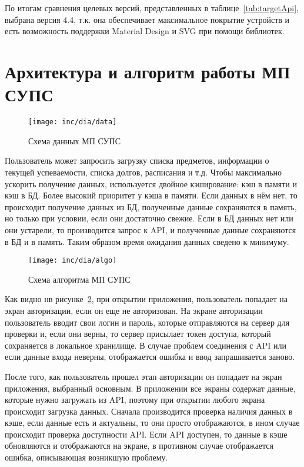 По итогам сравнения целевых версий, представленных в таблице~\ref{tab:targetApi}, выбрана версия 4.4, т.к. она обеспечивает максимальное покрытие устройств и есть возможность поддержки Material Design и SVG при помощи библиотек.

\section{Архитектура и алгоритм работы МП СУПС}
\label{sec:architecture}

\begin{figure}[ht]
  \centering
  \texttt{[image: inc/dia/data]}
  \caption{Схема данных МП СУПС}
  \label{fig:data}
\end{figure}

Пользователь может запросить загрузку списка предметов, информации о текущей успеваемости, списка долгов, расписания и т.д.
Чтобы максимально ускорить получение данных, используется двойное кэширование: кэш в памяти и кэш в БД.
Более высокий приоритет у кэша в памяти.
Если данных в нём нет, то происходит получение данных из БД, полученные данные сохраняются в память, но только при условии, если они достаточно свежие.
Если в БД данных нет или они устарели, то производится запрос к API, и полученные данные сохраняются в БД и в память.
Таким образом время ожидания данных сведено к минимуму.

\begin{figure}[ht]
  \centering
  \texttt{[image: inc/dia/algo]}
  \caption{Схема алгоритма МП СУПС}
  \label{fig:algo}
\end{figure}

Как видно нв рисунке~\ref{fig:algo}, при открытии приложения, пользователь попадает на экран авторизации, если он еще не авторизован.
На экране авторизации пользователь вводит свои логин и пароль, которые отправляются на сервер для проверки и, если они верны, то сервер присылает токен доступа, который сохраняется в локальное хранилище.
В случае проблем соединения с API или если данные входа неверны, отображается ошибка и ввод запрашивается заново.

После того, как пользователь прошел этап авторизации он попадает на экран приложения, выбранный основным.
В приложении все экраны содержат данные, которые нужно загружать из API, поэтому при открытии любого экрана происходит загрузка данных.
Сначала производится проверка наличия данных в кэше, если данные есть и актуальны, то они просто отображаются, в ином случае происходит проверка доступности API\@.
Если API доступен, то данные в кэше обновляются и отображаются на экране, в противном случае отображается ошибка, описывающая возникшую проблему.

